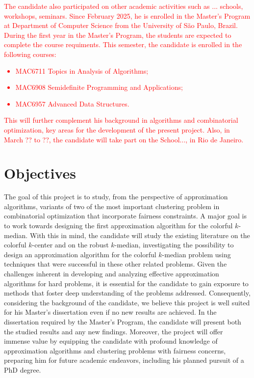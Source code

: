 \documentclass[12pt]{article}
\begin{document}
\textcolor{red}{The candidate also participated on other academic activities such as ... schools, workshops, seminars. 
Since February 2025, he is enrolled in the Master's Program at Department of Computer Science from the University of São Paulo, Brazil.  
During the first year in the Master's Program, the students are expected to complete the course requiments. 
This semester, the candidate is enrolled in the following courses: 
\begin{itemize} 
  \item MAC6711 Topics in Analysis of Algorithms;
  \item MAC6908 Semidefinite Programming and Applications;
  \item MAC6957 Advanced Data Structures.
\end{itemize}
This will further complement his background in algorithms and combinatorial optimization, key areas for the development of the present project.  Also, in March ?? to ??, the candidate will take part on the School..., in Rio de Janeiro.}

\newpage

\section{Objectives}


The goal of this project is to study, from the perspective of approximation algorithms, variants of two of 
the most important clustering problem in combinatorial optimization that incorporate fairness constraints.
A major goal is to work towards designing the first approximation algorithm for the colorful $k$-median. 
With this in mind, the candidate will study the existing literature on the colorful $k$-center and on the robust $k$-median, 
investigating the possibility to design an approximation algorithm for the colorful $k$-median problem using 
techniques that were successful in these other related problems.  
Given the challenges inherent in developing and analyzing effective approximation algorithms for hard problems, 
it is essential for the candidate to gain exposure to methods that foster deep understanding of the problems addressed.
Consequently, considering the background of the candidate, we believe this project is well suited for his Master's dissertation
even if no new results are achieved. 
In the dissertation required by the Master's Program, the candidate will present both the studied results and any new findings.
Moreover, the project will offer immense value by equipping the candidate with profound knowledge of approximation algorithms 
and clustering problems with fairness concerns, preparing him for future academic endeavors, including his planned pursuit of a PhD degree.
\end{document}

